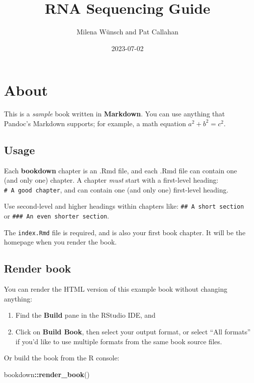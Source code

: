 \documentclass[
]{book}
\title{RNA Sequencing Guide}
\author{Milena Wünsch and Pat Callahan}
\date{2023-07-02}
\newenvironment{Shaded}{\begin{snugshade}}{\end{snugshade}}
\newcommand{\FunctionTok}[1]{\textcolor[rgb]{0.13,0.29,0.53}{\textbf{#1}}}
\newcommand{\NormalTok}[1]{#1}
\newcommand{\SpecialCharTok}[1]{\textcolor[rgb]{0.81,0.36,0.00}{\textbf{#1}}}
\begin{document}
\maketitle

{
\setcounter{tocdepth}{1}
\tableofcontents
}
\hypertarget{about}{%
\chapter{About}\label{about}}

This is a \emph{sample} book written in \textbf{Markdown}. You can use anything that Pandoc's Markdown supports; for example, a math equation \(a^2 + b^2 = c^2\).

\hypertarget{usage}{%
\section{Usage}\label{usage}}

Each \textbf{bookdown} chapter is an .Rmd file, and each .Rmd file can contain one (and only one) chapter. A chapter \emph{must} start with a first-level heading: \texttt{\#\ A\ good\ chapter}, and can contain one (and only one) first-level heading.

Use second-level and higher headings within chapters like: \texttt{\#\#\ A\ short\ section} or \texttt{\#\#\#\ An\ even\ shorter\ section}.

The \texttt{index.Rmd} file is required, and is also your first book chapter. It will be the homepage when you render the book.

\hypertarget{render-book}{%
\section{Render book}\label{render-book}}

You can render the HTML version of this example book without changing anything:

\begin{enumerate}
\def\labelenumi{\arabic{enumi}.}
\item
  Find the \textbf{Build} pane in the RStudio IDE, and
\item
  Click on \textbf{Build Book}, then select your output format, or select ``All formats'' if you'd like to use multiple formats from the same book source files.
\end{enumerate}

Or build the book from the R console:

\begin{Shaded}
\begin{Highlighting}[]
\NormalTok{bookdown}\SpecialCharTok{::}\FunctionTok{render\_book}\NormalTok{()}
\end{Highlighting}
\end{Shaded}
\end{document}
